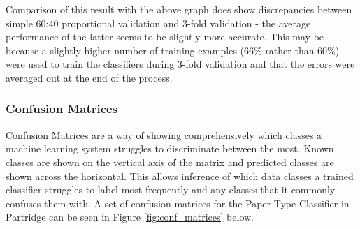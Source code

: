 Comparison of this result with the above graph does show discrepancies between
simple 60:40 proportional validation and 3-fold validation - the average
performance of the latter seems to be slightly more accurate. This may be
because a slightly higher number of training examples (66\% rather than 60\%)
were used to train the classifiers during 3-fold validation and that the errors
were averaged out at the end of the process.

\subsubsection{ Confusion Matrices}

Confusion Matrices are a way of showing comprehensively which classes a machine
learning system struggles to discriminate between the most. Known classes are
shown on the vertical axis of the matrix and predicted classes are shown across
the horizontal. This allows inference of which data classes a trained
classifier struggles to label most frequently and any classes that it commonly
confuses them with. A set of confusion matrices for the Paper Type Classifier
in Partridge can be seen in Figure \ref{fig:conf_matrices} below.

